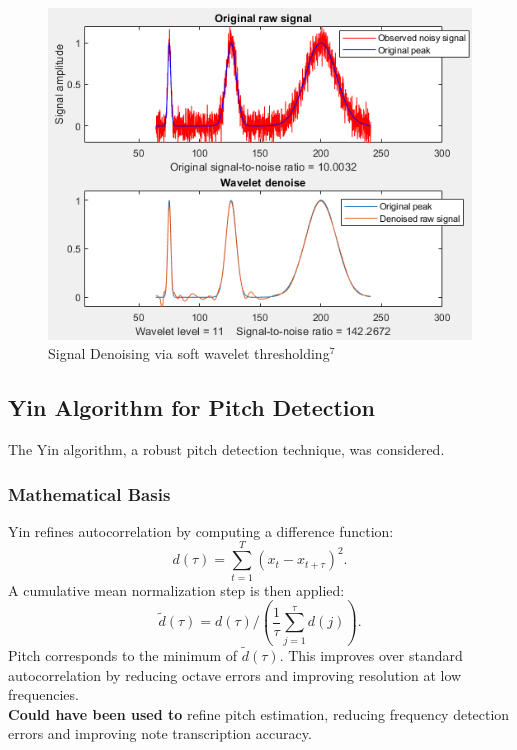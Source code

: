 \documentclass{article}
\begin{document}
\begin{figure}[h]
\includegraphics[width=125mm,scale=0.5]{docs/LiteratureReview/images/denoise-filter.png}
\caption{ Signal Denoising via soft wavelet thresholding$^7$}
\end{figure}

\newpage



\subsection{Yin Algorithm for Pitch Detection}
The Yin algorithm, a robust pitch detection technique, was considered.

\subsubsection{Mathematical Basis}
Yin refines autocorrelation by computing a difference function:
\begin{equation}
d(\tau) = \sum_{t=1}^{T} (x_t - x_{t+\tau})^2.
\end{equation}
A cumulative mean normalization step is then applied:
\begin{equation}
\tilde{d}(\tau) = d(\tau) / \left(\frac{1}{\tau} \sum_{j=1}^{\tau} d(j) \right).
\end{equation}
Pitch corresponds to the minimum of $\tilde{d}(\tau)$. This improves over standard autocorrelation by reducing octave errors and improving resolution at low frequencies. \\

\textbf{Could have been used to} refine pitch estimation, reducing frequency detection errors and improving note transcription accuracy.
\end{document}

